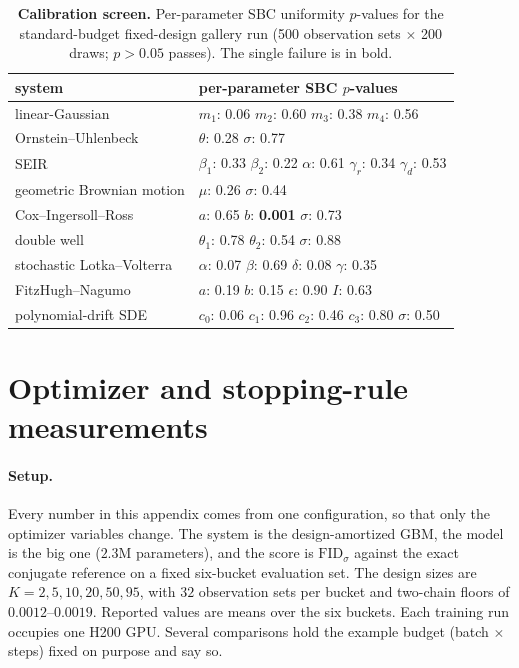 \documentclass[10pt]{article}
\newcommand{\FIDsd}{\mathrm{FID}_{\sigma}}
\begin{document}
\begin{table}[t]
\centering
\footnotesize
\begin{tabular}{@{}ll@{}}
\toprule
system & per-parameter SBC $p$-values \\
\midrule
linear-Gaussian & $m_1$: 0.06 \quad $m_2$: 0.60 \quad $m_3$: 0.38 \quad $m_4$: 0.56 \\
Ornstein--Uhlenbeck & $\theta$: 0.28 \quad $\sigma$: 0.77 \\
SEIR & $\beta_1$: 0.33 \quad $\beta_2$: 0.22 \quad $\alpha$: 0.61 \quad $\gamma_r$: 0.34 \quad $\gamma_d$: 0.53 \\
geometric Brownian motion & $\mu$: 0.26 \quad $\sigma$: 0.44 \\
Cox--Ingersoll--Ross & $a$: 0.65 \quad $b$: \textbf{0.001} \quad $\sigma$: 0.73 \\
double well & $\theta_1$: 0.78 \quad $\theta_2$: 0.54 \quad $\sigma$: 0.88 \\
stochastic Lotka--Volterra & $\alpha$: 0.07 \quad $\beta$: 0.69 \quad $\delta$: 0.08 \quad $\gamma$: 0.35 \\
FitzHugh--Nagumo & $a$: 0.19 \quad $b$: 0.15 \quad $\epsilon$: 0.90 \quad $I$: 0.63 \\
polynomial-drift SDE & $c_0$: 0.06 \quad $c_1$: 0.96 \quad $c_2$: 0.46 \quad $c_3$: 0.80 \quad $\sigma$: 0.50 \\
\bottomrule
\end{tabular}
\caption{\textbf{Calibration screen.} Per-parameter SBC uniformity $p$-values for the standard-budget
fixed-design gallery run (500 observation sets $\times$ 200 draws; $p > 0.05$ passes). The single
failure is in bold.}
\label{tab:pvals}
\end{table}

\section{Optimizer and stopping-rule measurements}
\label{app:optmeas}

\paragraph{Setup.} Every number in this appendix comes from one configuration, so that only the
optimizer variables change. The system is the design-amortized GBM, the model is the big one ($2.3$M
parameters), and the score is $\FIDsd$ against the exact conjugate reference on a fixed six-bucket
evaluation set. The design sizes are $K = 2, 5, 10, 20, 50, 95$, with $32$ observation sets per bucket
and two-chain floors of $0.0012$--$0.0019$. Reported values are means over the six buckets. Each
training run occupies one H200 GPU. Several comparisons hold the example budget (batch $\times$ steps)
fixed on purpose and say so.
\end{document}
